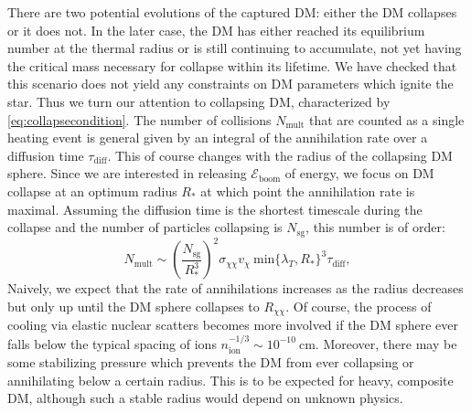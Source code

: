 \documentclass[preprintnumbers,amsmath,amssymb,prd,superscriptaddress]{revtex4}
\newcommand{\Eboom}{\mathcal{E}_\text{boom}}
\def\r{\right)}
\def\l{\left(}
\begin{document}
There are two potential evolutions of the captured DM: either the DM collapses or it does not. 
In the later case, the DM has either reached its equilibrium number at the thermal radius or is still continuing to accumulate, not yet having the critical mass necessary for collapse within its lifetime.
We have checked that this scenario does not yield any constraints on DM parameters which ignite the star. 
Thus we turn our attention to collapsing DM, characterized by \eqref{eq:collapsecondition}. 
The number of collisions $N_\text{mult}$ that are counted as a single heating event is general given by an integral of the annihilation rate over a diffusion time $\tau_\text{diff}$.
This of course changes with the radius of the collapsing DM sphere.
Since we are interested in releasing $\Eboom$ of energy, we focus on DM collapse at an optimum radius $R_*$ at which point the annihilation rate is maximal.
Assuming the diffusion time is the shortest timescale during the collapse and the number of particles collapsing is $N_\text{sg}$, this number is of order:
\begin{equation}
\label{eq:nmulti}
N_\text{mult} \sim \l \frac{N_\text{sg}}{R_*^3}\r^2  \sigma_{\chi \chi} v_\chi ~\text{min}\{\lambda_T, R_*\}^3 \tau_\text{diff},
\end{equation}
Naively, we expect that the rate of annihilations increases as the radius decreases but only up until the DM sphere collapses to $R_{\chi \chi}$.
Of course, the process of cooling via elastic nuclear scatters becomes more involved if the DM sphere ever falls below the typical spacing of ions $n_\text{ion}^{-1/3} \sim 10^{-10} ~\text{cm}$. 
Moreover, there may be some stabilizing pressure which prevents the DM from ever collapsing or annihilating below a certain radius.
This is to be expected for heavy, composite DM, although such a stable radius would depend on unknown physics. 
\end{document}
